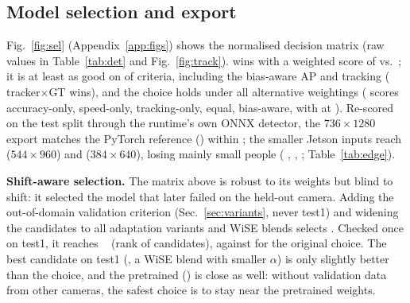 \subsection{Model selection and export}
Fig.~\ref{fig:sel} (Appendix~\ref{app:figs}) shows the normalised decision matrix (raw values in Table~\ref{tab:det} and
Fig.~\ref{fig:track}). \MsWinner{} wins with a weighted score of
\MsScoreYolo{} vs.\ \MsScoreRf; it is at least as good on \MsCritWins{} of \MsCritN{} criteria, including
the bias-aware AP and tracking (\MsTrackWinsYolo{} tracker$\times$GT wins), and the choice holds under all \MsNumAlt{} alternative
weightings (\rfdetr{} scores \MsAltAccRf{} accuracy-only, \MsAltSpeedRf{} speed-only, \MsAltTrackRf{}
tracking-only, \MsAltEqualRf{} equal, \MsAltBiasRf{} bias-aware, with \yolo{} at \MsScoreYolo). Re-scored on the test split through the runtime's own ONNX
detector, the $736{\times}1280$ export matches the PyTorch reference (\OnnxParityPt) within \OnnxParityDiff{}
\AP; the smaller Jetson inputs reach \OnnxMidAp{} ($544{\times}960$) and \OnnxLoAp{} ($384{\times}640$), losing
mainly small people (\APsm{} \OnnxHiApSmall, \OnnxMidApSmall, \OnnxLoApSmall\ifHaveEdge; Table~\ref{tab:edge}\fi).




\ifHaveRobustSel
\textbf{Shift-aware selection.} The matrix above is robust to its weights but blind to shift: it selected the model
that later failed on the held-out camera. Adding the out-of-domain validation criterion (Sec.~\ref{sec:variants},
never test1) and widening the candidates to all adaptation variants and WiSE blends selects \SrWinner{}. Checked once
on test1, it reaches \AP{}~\SrWinnerHo{} (rank \SrWinnerRank{} of \SrN{} candidates), against \SrOrigHo{} for the
original choice.
The best candidate on test1 (\MsWiFtHo, a WiSE blend with smaller $\alpha$) is only slightly better than the choice, and the pretrained \yolo{} (\MsPtHo) is close as well: without validation data from other cameras, the
safest choice is to stay near the pretrained weights.
\fi

